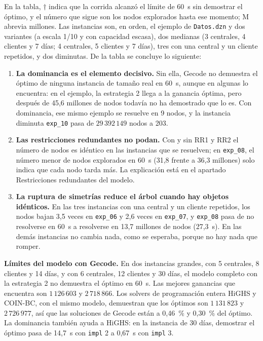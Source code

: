 En la tabla, $\dagger$ indica que la corrida alcanzó el límite de 60~s sin demostrar el óptimo, y el número que sigue son los nodos explorados hasta ese momento; M abrevia millones. Las instancias son, en orden, el ejemplo de \texttt{Datos.dzn} y dos variantes (a escala 1/10 y con capacidad escasa), dos medianas (3 centrales, 4 clientes y 7 días; 4 centrales, 5 clientes y 7 días), tres con una central y un cliente repetidos, y dos diminutas. De la tabla se concluye lo siguiente:

\begin{enumerate}
    \item \textbf{La dominancia es el elemento decisivo.} Sin ella, Gecode no demuestra el óptimo de ninguna instancia de tamaño real en 60~s, aunque en algunas lo encuentra: en el ejemplo, la estrategia 2 llega a la ganancia óptima, pero después de 45,6 millones de nodos todavía no ha demostrado que lo es. Con dominancia, ese mismo ejemplo se resuelve en 9 nodos, y la instancia diminuta \texttt{exp\_10} pasa de $29\,392\,149$ nodos a 203.
    \item \textbf{Las restricciones redundantes no podan.} Con y sin RR1 y RR2 el número de nodos es idéntico en las instancias que se resuelven; en \texttt{exp\_08}, el número menor de nodos explorados en 60~s (31,8 frente a 36,3 millones) solo indica que cada nodo tarda más. La explicación está en el apartado Restricciones redundantes del modelo.
    \item \textbf{La ruptura de simetrías reduce el árbol cuando hay objetos idénticos.} En las tres instancias con una central y un cliente repetidos, los nodos bajan 3,5 veces en \texttt{exp\_06} y 2,6 veces en \texttt{exp\_07}, y \texttt{exp\_08} pasa de no resolverse en 60~s a resolverse en 13,7 millones de nodos (27,3~s). En las demás instancias no cambia nada, como se esperaba, porque no hay nada que romper.
\end{enumerate}

\textbf{Límites del modelo con Gecode.} En dos instancias grandes, con 5 centrales, 8 clientes y 14 días, y con 6 centrales, 12 clientes y 30 días, el modelo completo con la estrategia 2 no demuestra el óptimo en 60~s. Las mejores ganancias que encuentra son $1\,126\,603$ y $2\,718\,866$. Los solvers de programación entera HiGHS y COIN-BC, con el mismo modelo, demuestran que los óptimos son $1\,131\,823$ y $2\,726\,977$, así que las soluciones de Gecode están a 0,46~\% y 0,30~\% del óptimo. La dominancia también ayuda a HiGHS: en la instancia de 30 días, demostrar el óptimo pasa de 14,7~s con \texttt{impl} 2 a 0,67~s con \texttt{impl} 3.

